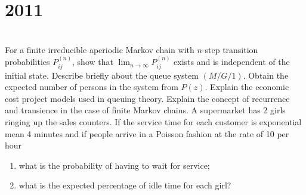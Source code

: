 \section*{2011}
\vspace{-.5cm}
\hrulefill \smallskip\\
 For a finite irreducible aperiodic Markov chain with $n$-step transition probabilities $P_{ij}^{(n)}$, show that $\displaystyle \lim_{n \to \infty}P_{ij}^{(n)}$ exists and is independent of the initial state.
\myline
{} Describe briefly about the queue system $(M/G/1)$. Obtain the expected number of persons in the system from $P(z)$.
\myline
{} Explain the economic cost project models used in queuing theory.
\myline
{} Explain the concept of recurrence and transience in the case of finite Markov chains.
\myline
{} A supermarket has 2 girls ringing up the sales counters. If the service time for each customer is exponential mean 4 minutes and if people arrive in a Poisson fashion at the rate of 10 per hour
\begin{enumerate}[topsep=0pt, itemsep = -1ex,label=(\roman*)]
    \item what is the probability of having to wait for service;
    \item what is the expected percentage of idle time for each girl?
\end{enumerate}


